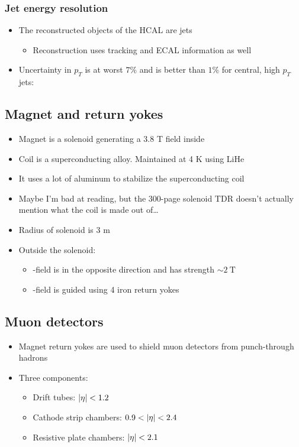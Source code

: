 \subsubsection{Jet energy resolution}
\begin{itemize}
  \item The reconstructed objects of the HCAL are jets
  \begin{itemize}
    \item Reconstruction uses tracking and ECAL information as well
  \end{itemize}
  \item Uncertainty in $p_T$ is at worst $7\%$ and is better than $1\%$ for central, high $p_T$ jets:
\end{itemize}

\subsection{Magnet and return yokes}
\begin{itemize}
  \item Magnet is a solenoid generating a 3.8 T field inside
  \item Coil is a superconducting alloy. Maintained at 4 K using LiHe
  \item It uses a lot of aluminum to stabilize the superconducting coil
  \item Maybe I'm bad at reading, but the 300-page solenoid TDR doesn't actually mention what the coil is made out of\dots
  \item Radius of solenoid is 3 m
  \item Outside the solenoid:
  \begin{itemize}
    \item \B-field is in the opposite direction and has strength $\sim 2~\text{T}$
    \item \B-field is guided using 4 iron return yokes
  \end{itemize}
\end{itemize}

\subsection{Muon detectors}
\begin{itemize}
  \item Magnet return yokes are used to shield muon detectors from punch-through hadrons
  \item Three components:
  \begin{itemize}
    \item Drift tubes: $|\eta|<1.2$
    \item Cathode strip chambers: $0.9<\abseta<2.4$
    \item Resistive plate chambers: $|\eta|<2.1$
  \end{itemize}
\end{itemize}

